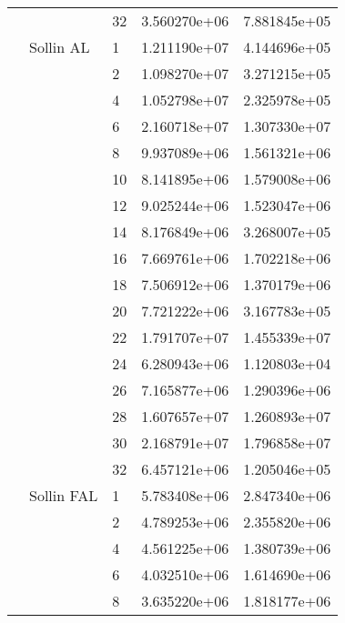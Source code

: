 \begin{tabular}{lllrr}
                      &            & 32 &  3.560270e+06 &  7.881845e+05 \\
                      & Sollin AL & 1  &  1.211190e+07 &  4.144696e+05 \\
                      &            & 2  &  1.098270e+07 &  3.271215e+05 \\
                      &            & 4  &  1.052798e+07 &  2.325978e+05 \\
                      &            & 6  &  2.160718e+07 &  1.307330e+07 \\
                      &            & 8  &  9.937089e+06 &  1.561321e+06 \\
                      &            & 10 &  8.141895e+06 &  1.579008e+06 \\
                      &            & 12 &  9.025244e+06 &  1.523047e+06 \\
                      &            & 14 &  8.176849e+06 &  3.268007e+05 \\
                      &            & 16 &  7.669761e+06 &  1.702218e+06 \\
                      &            & 18 &  7.506912e+06 &  1.370179e+06 \\
                      &            & 20 &  7.721222e+06 &  3.167783e+05 \\
                      &            & 22 &  1.791707e+07 &  1.455339e+07 \\
                      &            & 24 &  6.280943e+06 &  1.120803e+04 \\
                      &            & 26 &  7.165877e+06 &  1.290396e+06 \\
                      &            & 28 &  1.607657e+07 &  1.260893e+07 \\
                      &            & 30 &  2.168791e+07 &  1.796858e+07 \\
                      &            & 32 &  6.457121e+06 &  1.205046e+05 \\
                      & Sollin FAL & 1  &  5.783408e+06 &  2.847340e+06 \\
                      &            & 2  &  4.789253e+06 &  2.355820e+06 \\
                      &            & 4  &  4.561225e+06 &  1.380739e+06 \\
                      &            & 6  &  4.032510e+06 &  1.614690e+06 \\
                      &            & 8  &  3.635220e+06 &  1.818177e+06 \\

\end{tabular}
